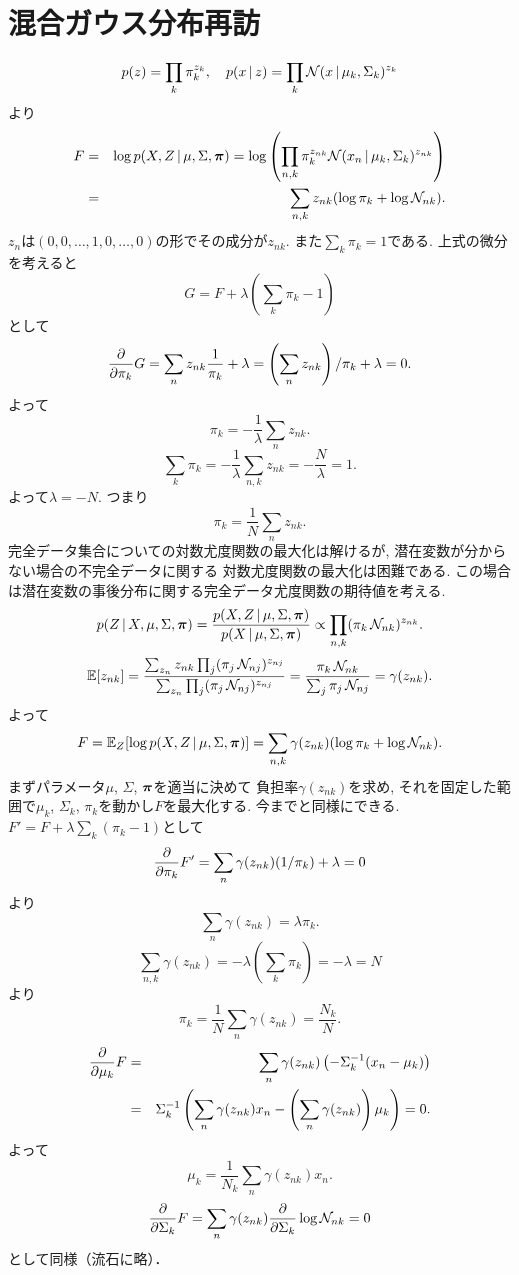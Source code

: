 \section{混合ガウス分布再訪}
$$
p(z)=\prod_k \pi_k^{z_{k}}, \quad p(x\,|\,z)=\prod_k {\cal N}(x\,|\,\mu_k,\Sigma_k)^{z_k}
$$
より
\begin{eqnarray*}
F
 &=& \log p(X,Z\,|\,\mu,\Sigma,\bm{\pi})
 = \log \left(\prod_{n,k} \pi_k^{z_{nk}}{\cal N}(x_n\,|\,\mu_k,\Sigma_k)^{z_{nk}}\right)\\
 &=& \sum_{n,k} z_{nk}(\log \pi_k + \log {\cal N}_{nk}).
\end{eqnarray*}
$z_n$は$(0, 0,\ldots, 1, 0, \ldots, 0)$の形でその成分が$z_{nk}$.
また$\sum_k \pi_k=1$である.
上式の微分を考えると
$$
G=F+\lambda\left(\sum_k \pi_k-1\right)
$$
として
$$
\frac{\partial}{\partial \pi_k}G=\sum_n z_{nk}\frac{1}{\pi_k}+\lambda=\left(\sum_n z_{nk}\right)/\pi_k + \lambda=0.
$$
よって
$$
\pi_k = -\frac{1}{\lambda}\sum_n z_{nk}.
$$
$$
\sum_k \pi_k=-\frac{1}{\lambda}\sum_{n,k}z_{nk}=-\frac{N}{\lambda}=1.
$$
よって$\lambda=-N$.
つまり
$$
\pi_k=\frac{1}{N}\sum_n z_{nk}.
$$
完全データ集合についての対数尤度関数の最大化は解けるが,
潜在変数が分からない場合の不完全データに関する
対数尤度関数の最大化は困難である.
この場合は潜在変数の事後分布に関する完全データ尤度関数の期待値を考える.
$$
p(Z\,|\,X,\mu,\Sigma,\bm{\pi})
 = \frac{p(X,Z\,|\,\mu,\Sigma,\bm{\pi})}{p(X\,|\,\mu,\Sigma,\bm{\pi})}
 \propto \prod_{n,k} (\pi_k\,{\cal N}_{nk})^{z_{nk}}.
$$
$$
\mathbb{E}[z_{nk}]=\frac{\sum_{z_n} z_{nk} \prod_j (\pi_j\,{\cal N}_{nj})^{z_{nj}}}
               {\sum_{z_n} \prod_j(\pi_j\,{\cal N}_{nj})^{z_{nj}}}
         =\frac{\pi_k\,{\cal N}_{nk}}{\sum_j \pi_j\,{\cal N}_{nj}} = \gamma(z_{nk}).
$$
よって
$$
F=\mathbb{E}_Z[\log p(X,Z\,|\,\mu,\Sigma,\bm{\pi})]=\sum_{n,k}\gamma(z_{nk})(\log \pi_k + \log {\cal N}_{nk}).
$$
まずパラメータ$\mu$, $\Sigma$, $\bm{\pi}$を適当に決めて
負担率$\gamma(z_{nk})$を求め,
それを固定した範囲で$\mu_k$, $\Sigma_k$, $\pi_k$を動かし$F$を最大化する.
今までと同様にできる.
$F'=F+\lambda\sum_k\left(\pi_k-1\right)$として
$$
\frac{\partial}{\partial \pi_k}F'=\sum_n \gamma(z_{nk})(1/\pi_k)+\lambda=0
$$
より
$$
\sum_n \gamma(z_{nk})=\lambda \pi_k.
$$
$$
\sum_{n,k}\gamma(z_{nk})=-\lambda\left(\sum_k \pi_k\right)=-\lambda=N
$$
より
$$
\pi_k=\frac{1}{N}\sum_n \gamma(z_{nk})=\frac{N_k}{N}.
$$
\begin{eqnarray*}
\frac{\partial}{\partial \mu_k}F
&=&\sum_n\gamma(z_{nk})\left(-\Sigma_k^{-1}(x_n-\mu_k)\right)
\\
&=&\Sigma_k^{-1}\left(\sum_n \gamma(z_{nk})x_n-\left(\sum_n \gamma(z_{nk})\right)\mu_k\right)=0.
\end{eqnarray*}
よって
$$
\mu_k=\frac{1}{N_k}\sum_n \gamma(z_{nk})x_n.
$$
$$
\frac{\partial}{\partial \Sigma_k}F=\sum_n \gamma(z_{nk}) \frac{\partial}{\partial \Sigma_k}\log {\cal N}_{nk}=0
$$
として同様（流石に略）．

